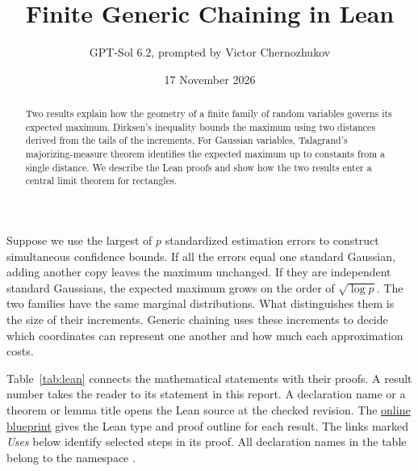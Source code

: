 \documentclass[11pt,letterpaper,twoside,leqno]{article}
\title{\Large Finite Generic Chaining in Lean}
\author{\normalsize GPT-Sol 6.2, prompted by Victor Chernozhukov}
\date{\normalsize 17 November 2026}
\theoremstyle{bookplain}
\newcommand{\nm}[1]{\texttt{\detokenize{#1}}}
\begin{document}
\maketitle
\begin{abstract}
Two results explain how the geometry of a finite family of random variables governs its expected maximum. Dirksen's inequality bounds the maximum using two distances derived from the tails of the increments. For Gaussian variables, Talagrand's majorizing-measure theorem identifies the expected maximum up to constants from a single distance. We describe the Lean proofs and show how the two results enter a central limit theorem for rectangles.
\end{abstract}

Suppose we use the largest of $p$ standardized estimation errors to construct simultaneous confidence bounds. If all the errors equal one standard Gaussian, adding another copy leaves the maximum unchanged. If they are independent standard Gaussians, the expected maximum grows on the order of $\sqrt{\log p}$. The two families have the same marginal distributions. What distinguishes them is the size of their increments. Generic chaining uses these increments to decide which coordinates can represent one another and how much each approximation costs.

Table~\ref{tab:lean} connects the mathematical statements with their proofs. A result number takes the reader to its statement in this report. A declaration name or a theorem or lemma title opens the Lean source at the checked revision. The \href{https://github.com/VC2015/generic-chaining/blob/main/docs/BLUEPRINT.md}{online blueprint} gives the Lean type and proof outline for each result. The links marked \emph{Uses} below identify selected steps in its proof. All declaration names in the table belong to the namespace \nm{GenericChaining}.
\end{document}
